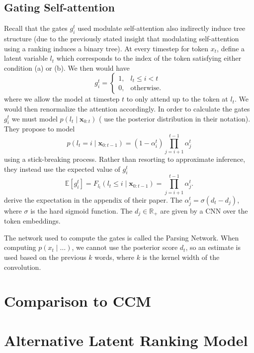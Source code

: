 \documentclass{article}
\newcommand\E[1]{\mathbb{E}\left[#1\right]}
\newcommand{\bx}{\mathbf{x}}
\newcommand{\R}{\mathbb{R}}
\begin{document}
\subsection{Gating Self-attention}
Recall that the gates $g_i^t$ used modulate self-attention also indirectly induce tree structure
(due to the previously stated insight that modulating self-attention
using a ranking induces a binary tree).
At every timestep for token $x_t$,
\citet{shen2018prpn} define a latent variable $l_t$ which corresponds to the index of the 
token satisfying either condition (a) or (b).
We then would have $$g_i^t = \left\{\begin{array}{lr}
1, & l_t \le i < t\\
0, & \textrm{otherwise.}
\end{array}\right.$$
where we allow the model at timestep $t$ to only attend up to the token at $l_t$.
We would then renormalize the attention accordingly.
In order to calculate the gates $g_i^t$ we must model $p(l_t\mid\bx_{0:t})$ 
(\citet{shen2018prpn} use the posterior distribution in their notation).
They propose to model 
$$p(l_t=i\mid\bx_{0:t-1})=(1-\alpha_i^t)\prod_{j=i+1}^{t-1}\alpha_j^t$$
using a stick-breaking process.
Rather than resorting to approximate inference, they instead use the expected value of $g_i^t$
$$\E{g_i^t} = F_{l_t}(l_t \le i\mid\bx_{0:t-1}) = \prod_{j=i+1}^{t-1}\alpha_j^t.$$
\citet{shen2018prpn} derive the expectation in the appendix of their paper.
The $\alpha_j^t = \sigma(d_t - d_j)$, where $\sigma$ is the hard sigmoid function.
The $d_j\in\R_+$ are given by a CNN over the token embeddings.

The network used to compute the gates is called the Parsing Network.
When computing $p(x_t\mid\ldots)$, we cannot use the posterior score $d_t$,
so an estimate is used based on the previous $k$ words, where $k$ is the 
kernel width of the convolution.

\section{Comparison to CCM \citep{klein-2002-ccm}}
\citep{klein-2002-ccm2}
\citep{golland-2012-ccm,huang-2012-ccm}

\section{Alternative Latent Ranking Model}
\end{document}

